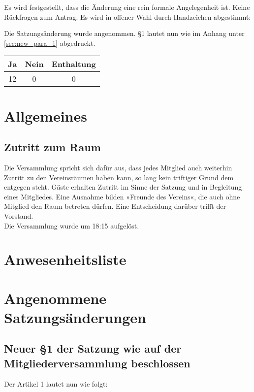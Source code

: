 \documentclass{scrartcl}
\begin{document}
Es wird festgestellt, dass die Änderung eine rein formale Angelegenheit
ist. Keine Rückfragen zum Antrag. Es wird in offener Wahl durch
Handzeichen abgestimmt:

Die Satzungsänderung wurde angenommen. §1 lautet nun wie im Anhang unter
\ref{sec:new_para_1} abgedruckt.

\begin{table}[h!]
    \centering
    \begin{tabular}{c|c|c}
        \textbf{Ja} & \textbf{Nein} & \textbf{Enthaltung} \\ \hline
        12 & 0 & 0
    \end{tabular}
\end{table}

\section{Allgemeines}

\subsection{Zutritt zum Raum}
Die Versammlung spricht sich dafür aus, dass jedes Mitglied auch
weiterhin Zutritt zu den Vereinsräumen haben kann, so lang kein
triftiger Grund dem entgegen steht.
Gäste erhalten Zutritt im Sinne der Satzung und in Begleitung eines
Mitgliedes.
Eine Ausnahme bilden »Freunde des Vereins«, die auch ohne Mitglied den
Raum betreten dürfen.
Eine Entscheidung darüber trifft der Vorstand. \\[1ex]

Die Versammlung wurde um 18:15 aufgelöst.

\newpage 
\appendix{}
\section{Anwesenheitsliste}
\newpage 
\section{Angenommene Satzungsänderungen}
\subsection{Neuer §1 der Satzung wie auf der Mitgliederversammlung beschlossen}
Der Artikel 1 lautet nun wie folgt: 
\end{document}
